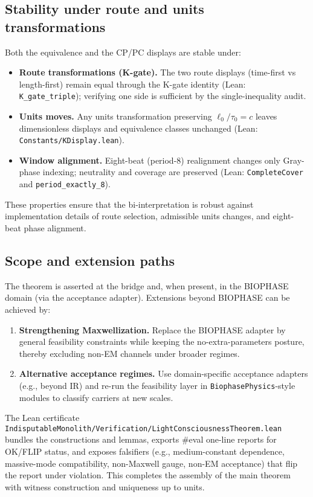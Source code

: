 \documentclass[12pt,a4paper]{article}
\begin{document}
\subsection{Stability under route and units transformations}
Both the equivalence and the CP/PC displays are stable under:
\begin{itemize}
  \item \textbf{Route transformations (K-gate).} The two route displays (time-first vs length-first) remain equal through the K-gate identity (Lean: \texttt{K\_gate\_triple}); verifying one side is sufficient by the single-inequality audit.
  \item \textbf{Units moves.} Any units transformation preserving \(\ell_0/\tau_0=c\) leaves dimensionless displays and equivalence classes unchanged (Lean: \texttt{Constants/KDisplay.lean}).
  \item \textbf{Window alignment.} Eight-beat (period-8) realignment changes only Gray-phase indexing; neutrality and coverage are preserved (Lean: \texttt{CompleteCover} and \texttt{period\_exactly\_8}).
\end{itemize}
These properties ensure that the bi-interpretation is robust against implementation details of route selection, admissible units changes, and eight-beat phase alignment.

\subsection{Scope and extension paths}
The theorem is asserted at the bridge and, when present, in the BIOPHASE domain (via the acceptance adapter). Extensions beyond BIOPHASE can be achieved by:
\begin{enumerate}
  \item \textbf{Strengthening Maxwellization.} Replace the BIOPHASE adapter by general feasibility constraints while keeping the no-extra-parameters posture, thereby excluding non-EM channels under broader regimes.
  \item \textbf{Alternative acceptance regimes.} Use domain-specific acceptance adapters (e.g., beyond IR) and re-run the feasibility layer in \texttt{BiophasePhysics}-style modules to classify carriers at new scales.
\end{enumerate}
The Lean certificate \texttt{IndisputableMonolith/Verification/LightConsciousnessTheorem.lean} bundles the constructions and lemmas, exports #eval one-line reports for OK/FLIP status, and exposes falsifiers (e.g., medium-constant dependence, massive-mode compatibility, non-Maxwell gauge, non-EM acceptance) that flip the report under violation. This completes the assembly of the main theorem with witness construction and uniqueness up to units.
\end{document}
